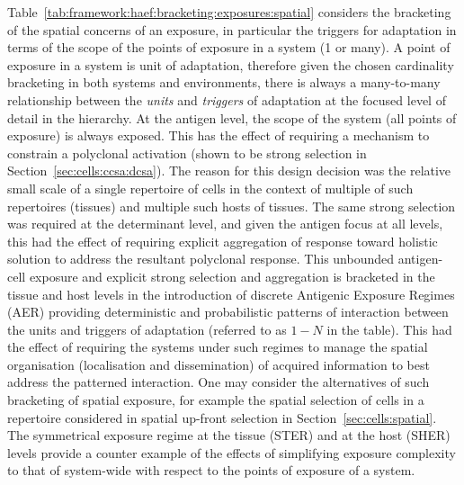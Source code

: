 Table~\ref{tab:framework:haef:bracketing:exposures:spatial} considers the bracketing of the spatial concerns of an exposure, in particular the triggers for adaptation in terms of the scope of the points of exposure in a system (1 or many). A point of exposure in a system is unit of adaptation, therefore given the chosen cardinality bracketing in both systems and environments, there is always a many-to-many relationship between the \emph{units} and \emph{triggers} of adaptation at the focused level of detail in the hierarchy.
At the antigen level, the scope of the system (all points of exposure) is always exposed. This has the effect of requiring a mechanism to constrain a polyclonal activation (shown to be strong selection in Section~\ref{sec:cells:ccsa:dcsa}). The reason for this design decision was the relative small scale of a single repertoire of cells in the context of multiple of such repertoires (tissues) and multiple such hosts of tissues. The same strong selection was required at the determinant level, and given the antigen focus at all levels, this had the effect of requiring explicit aggregation of response toward holistic solution to address the resultant polyclonal response.
This unbounded antigen-cell exposure and explicit strong selection and aggregation is bracketed in the tissue and host levels in the introduction of discrete Antigenic Exposure Regimes (AER) providing deterministic and probabilistic patterns of interaction between the units and triggers of adaptation (referred to as $1-N$ in the table). This had the effect of requiring the systems under such regimes to manage the spatial organisation (localisation and dissemination) of acquired information to best address the patterned interaction.
One may consider the alternatives of such bracketing of spatial exposure, for example the spatial selection of cells in a repertoire considered in spatial up-front selection in Section~\ref{sec:cells:spatial}. The symmetrical exposure regime at the tissue (STER) and at the host (SHER) levels provide a counter example of the effects of simplifying exposure complexity to that of system-wide with respect to the points of exposure of a system.

